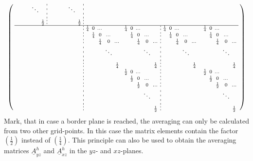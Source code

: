 \documentclass[pdftex,a4paper,parskip,listof=totoc,bibliography=totoc,onehalfspacing,12pt]{scrreprt}
\newcommand*\dashline{\hspace{-0.3em}\rotatebox[origin=c]{90}{\scalebox{-0.3}[1]{$-~~-$}}\hspace{-0.3em}}
\newcommand*\longdashline{\hspace{-0.3em}\rotatebox[origin=c]{90}{\scalebox{-0.4}[1]{$-~~-~~-~~-$}}\hspace{-0.3em}}
\begin{document}
\begin{align*}
\begin{psmallmatrix}
   	& &  &   &    &&  &  & & \ddots &  &\longdashline&&   & &    &  &    &&  &  & & \ddots &   &\longdashline     & & & & && & & & & && & & & && && & & & & \\
    & & & &   &&  & & & & \frac{1}{2} &\dashline& & & & &   && & & & & & \frac{1}{2}  &\dashline & & & && & & & & && & & & && && & & & & \\ \hline
	& & & & & && & & & & && && & & & && & & & &\dashline& \frac{1}{4} & 0 & \dots   & &   &&  \frac{1}{4} & 0 & \dots   & &   &\dashline&  \frac{1}{4} & 0 & \dots   & &   &&  & \frac{1}{4} & 0 & \dots & \\
  	& & & & & && & & & & && && & & & && & & & &\dashline& & \frac{1}{4} & 0 & \dots &   &&   & \frac{1}{4} & 0 & \dots &   &\dashline&   & \frac{1}{4} & 0 & \dots &   &&   & & \frac{1}{4} & 0 & \dots \\
    & & & & & && & & & & &&& & & & & && & & & &\dashline& & & \frac{1}{4} & 0 & \dots    &&  &  & \frac{1}{4} & 0 & \dots    &\dashline&   & & \frac{1}{4} & 0 & \dots   &&  &  &  & \frac{1}{4} & 0 & \dots \\
   	& & & & & && & & & & &&& & & & & && & & && \longdashline& & &  & \ddots &     &&  &  & & \ddots &   &     \longdashline & &   & &  \ddots &  &    &&  &  & & \ddots &   & \\
    & & & & & && & & & & && && & & & && & & &&\dashline& &  & & & \frac{1}{4} &&  & & & & \frac{1}{4} &\dashline& & & & & \frac{1}{4} && & & & & & \frac{1}{4} \\
    & & & & & && & & & & &&& & & & & && & & & &\dashline & &  &     & &   &&  \frac{1}{2} & 0 & \dots   & &   &\dashline&    &   &     & &   &&  & \frac{1}{2} & 0 & \dots & &  \\
 	&  & & & & && & & & & &&& & & & & && & & & & \dashline & & &  &  &   &&   & \frac{1}{2} & 0 & \dots &   &\dashline&   &   &   &   &   &&   & & \frac{1}{2} & 0 & \dots & \\
    & & & & & && & & & & &&& & & & & && & & & &\dashline & & &  &   &      &&  &  & \frac{1}{2} & 0 & \dots    &\dashline&   & &   &   &     &&  &  &  & \frac{1}{2} & 0 & \dots\\
   	& & & & & && & & & & &&& & & & & && & & &  &\longdashline &  & & &   &    &&  &  & & \ddots &  &\longdashline     &&   & &    &  &    &&  &  & & \ddots &   &    \\
   	& & & & & && & & & & &&& & & & & && & & &  &\dashline & & &  & &   &&  & & & & \frac{1}{2} &\dashline& & & & &   && & & & & & \frac{1}{2}\\ 
    \end{psmallmatrix}	\normalsize
\end{align*}
Mark, that in case a border plane is reached, the averaging can only be calculated from two other grid-points. In this case the matrix elements contain the factor $(\frac{1}{2})$ instead of $(\frac{1}{4})$. This principle can also be used to obtain the averaging matrices $\underline{A}^{h}_{yz}$ and $\underline{A}^{h}_{xz}$ in the $yz$- and $xz$-planes. 
\cleardoublepage
\end{document}
